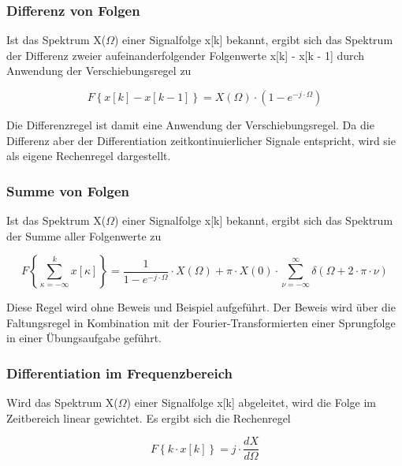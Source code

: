 \subsubsection{Differenz von Folgen}

\noindent Ist das Spektrum X($\Omega$) einer Signalfolge x[k] bekannt, ergibt sich das Spektrum der Differenz zweier aufeinanderfolgender Folgenwerte x[k] - x[k - 1] durch Anwendung der Verschiebungsregel zu

\begin{equation}\label{eq:sevensixtyseven}
F\left\{x\left[k\right]-x\left[k-1\right]\right\}=X\left(\Omega \right)\cdot \left(1-e^{-j\cdot \Omega } \right)
\end{equation}

\noindent Die Differenzregel ist damit eine Anwendung der Verschiebungsregel. Da die Differenz aber der Differentiation zeitkontinuierlicher Signale entspricht, wird sie als eigene Rechenregel dargestellt.

\subsubsection{Summe von Folgen}

\noindent Ist das Spektrum X($\Omega$) einer Signalfolge x[k] bekannt, ergibt sich das Spektrum der Summe aller Folgenwerte zu

\begin{equation}\label{eq:sevensixtyeight}
F\left\{\sum _{\kappa =-\infty }^{k}x\left[\kappa \right] \right\}=\frac{1}{1-e^{-j\cdot \Omega } } \cdot X\left(\Omega \right)+\pi \cdot X\left(0\right)\cdot \sum _{\nu =-\infty }^{\infty }\delta \left(\Omega +2\cdot \pi \cdot \nu \right)
\end{equation}

\noindent Diese Regel wird ohne Beweis und Beispiel aufgef\"{u}hrt. Der Beweis wird \"{u}ber die Faltungsregel in Kombination mit der Fourier-Transformierten einer Sprungfolge in einer \"{U}bungsaufgabe gef\"{u}hrt. 

\subsubsection{Differentiation im Frequenzbereich}

\noindent Wird das Spektrum X($\Omega$) einer Signalfolge x[k] abgeleitet, wird die Folge im Zeitbereich linear gewichtet. Es ergibt sich die Rechenregel

\begin{equation}\label{eq:sevensixtynine}
F\left\{k\cdot x\left[k\right]\right\}=j\cdot \frac{dX}{d\Omega}
\end{equation}

